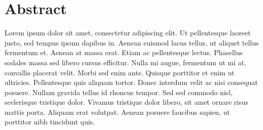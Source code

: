 
\cleardoublepage
{}
{}%
\hypertarget{abstract}{%
\chapter*{Abstract}\label{abstract}}
Lorem ipsum dolor sit amet, consectetur adipiscing elit. Ut pellentesque laoreet justo, sed tempus ipsum dapibus in. Aenean euismod lacus tellus, ut aliquet tellus fermentum et. Aenean at massa erat. Etiam ac pellentesque lectus. Phasellus sodales massa sed libero cursus efficitur. Nulla mi augue, fermentum ut mi at, convallis placerat velit. Morbi sed enim ante. Quisque porttitor et enim ut ultricies. Pellentesque quis aliquam tortor. Donec interdum velit ac nisi consequat posuere. Nullam gravida tellus id rhoncus tempor. Sed sed commodo nisl, scelerisque tristique dolor. Vivamus tristique dolor libero, sit amet ornare risus mattis porta. Aliquam erat volutpat. Aenean posuere faucibus sapien, ut porttitor nibh tincidunt quis.

\cleardoublepage
